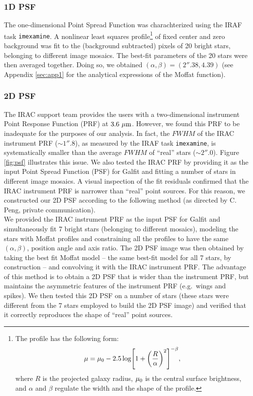 \documentclass[preprint2]{emulateapj}
\begin{document}
\subsubsection{1D PSF}
The one-dimensional Point Spread Function was charachterized using the IRAF task {\tt imexamine}.
A nonlinear least squares \citep{moffat1969} profile\footnote{The \citep{moffat1969} profile 
has the following form:
\begin{equation}
\mu = \mu_{\rm 0} - 2.5 \log \Biggl[ 1 + \biggl( \frac{R}{\alpha} \biggr)^2 \Biggr]^{-\beta} ,
\end{equation}
where $R$ is the projected galaxy radius, $\mu_{\rm 0}$ is the central surface brightness, and 
$\alpha$ and $\beta$ regulate the width and the shape of the profile.} 
of fixed center and zero background was fit to the 
(background subtracted) pixels of 20 bright stars, belonging to different image mosaics.
The best-fit parameters of the 20 stars were then averaged together. 
Doing so, we obtained %
$(\alpha, \beta) = (2''.38, 4.39)$ %
(see Appendix \ref{sec:app1} for the analytical expressions of the Moffat function).

\subsubsection{2D PSF}
The IRAC support team provides the users with a two-dimensional instrument Point Response Function (PRF) at $3.6~\rm \mu m$.
However, we found this PRF to be inadequate for the purposes of our analysis.
In fact, the $FWHM$ of the IRAC instrument PRF ($\sim 1''.8$), as measured by the IRAF task {\tt imexamine}, 
is systematically smaller than the average $FWHM$ of ``real'' stars ($\sim 2''.0$). 
Figure \ref{fig:psf} illustrates this issue.
We also tested the IRAC PRF by providing it as the input Point Spread Function (PSF) for Galfit 
and fitting a number of stars in different image mosaics.
A visual inspection of the fit residuals confirmed that the IRAC instrument PRF is narrower than ``real'' point sources.
For this reason, we constructed our 2D PSF according to the following method 
(as directed by C. Peng, private communication).\\
We provided the IRAC instrument PRF as the input PSF for Galfit 
and simultaneously fit 7 bright stars (belonging to different mosaics), 
modeling the stars with Moffat profiles 
and constraining all the profiles to have the same $(\alpha, \beta)$, position angle and axis ratio.
The 2D PSF image was then obtained by taking the best fit Moffat model -- the same best-fit model for all 7 stars, by construction -- 
and convolving it with the IRAC instrument PRF.
The advantage of this method is to obtain a 2D PSF that is wider than the instrument PRF, 
but maintains the asymmetric features of the instrument PRF (e.g.~wings and spikes).
We then tested this 2D PSF 
on a number of stars (these stars were different from the 7 stars employed to build the 2D PSF image)
and verified that it correctly reproduces the shape of ``real'' point sources. 
\end{document}

